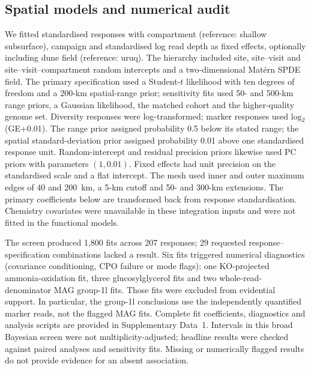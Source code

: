 \subsection{Spatial models and numerical audit}
We fitted standardised responses with compartment (reference: shallow subsurface), campaign and standardised log read depth as fixed effects, optionally including dune field (reference: uruq). The hierarchy included site, site--visit and site--visit--compartment random intercepts and a two-dimensional Mat\'ern SPDE field. The primary specification used a Student-$t$ likelihood with ten degrees of freedom and a 200-km spatial-range prior; sensitivity fits used 50- and 500-km range priors, a Gaussian likelihood, the matched cohort and the higher-quality genome set. Diversity responses were log-transformed; marker responses used log$_2$(GE+0.01). The range prior assigned probability 0.5 below its stated range; the spatial standard-deviation prior assigned probability 0.01 above one standardised response unit. Random-intercept and residual precision priors likewise used PC priors with parameters $(1,0.01)$. Fixed effects had unit precision on the standardised scale and a flat intercept. The mesh used inner and outer maximum edges of 40 and 200~km, a 5-km cutoff and 50- and 300-km extensions. The primary coefficients below are transformed back from response standardisation. Chemistry covariates were unavailable in these integration inputs and were not fitted in the functional models.

The screen produced 1,800 fits across 207 responses; 29 requested response--specification combinations lacked a result. Six fits triggered numerical diagnostics (covariance conditioning, CPO failure or mode flags): one KO-projected ammonia-oxidation fit, three glucosylglycerol fits and two whole-read-denominator MAG group-1l fits. Those fits were excluded from evidential support. In particular, the group-1l conclusions use the independently quantified marker reads, not the flagged MAG fits. Complete fit coefficients, diagnostics and analysis scripts are provided in Supplementary Data~1. Intervals in this broad Bayesian screen were not multiplicity-adjusted; headline results were checked against paired analyses and sensitivity fits. Missing or numerically flagged results do not provide evidence for an absent association.

